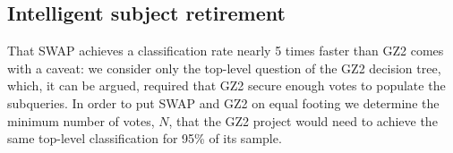 \subsection{Intelligent subject retirement}\label{chap3: swap is faster}

That SWAP achieves a classification rate nearly 5 times faster than GZ2 comes with a caveat: we consider only the top-level question of the GZ2 decision tree, which, it can be argued, required that GZ2 secure enough votes to populate the subqueries.  In order to put SWAP and GZ2 on equal footing we determine the minimum number of votes, $N$, that the GZ2 project would need to achieve the same top-level classification for 95\% of its sample.

